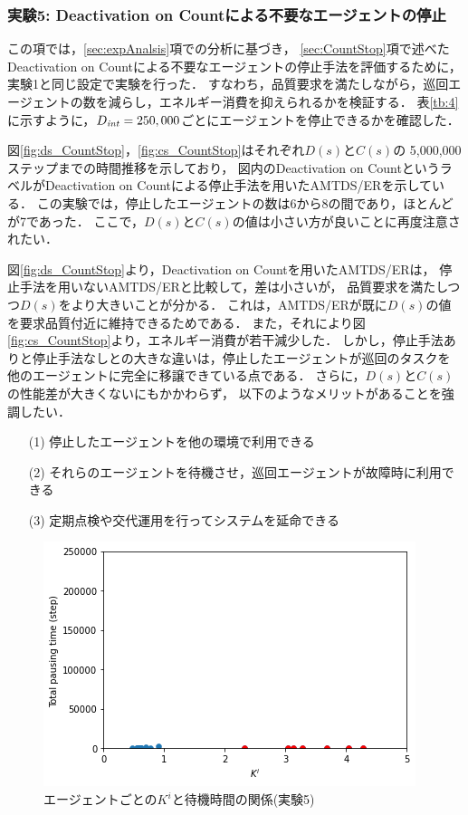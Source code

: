 \documentclass[12pt,a4j,twoside]{jarticle}
\def\DeactCheckInterval{D_{\it int}}
\begin{document}
  \subsubsection{実験5: Deactivation on Countによる不要なエージェントの停止}\label{ex:ER5}
  この項では，\ref{sec:expAnalsis}項での分析に基づき，
  \ref{sec:CountStop}項で述べたDeactivation on Countによる不要なエージェントの停止手法を評価するために，
  実験1と同じ設定で実験を行った．
  すなわち，品質要求を満たしながら，巡回エージェントの数を減らし，エネルギー消費を抑えられるかを検証する．
  表\ref{tb:4}に示すように，$\DeactCheckInterval=250,000$ごとにエージェントを停止できるかを確認した．
  \par

  図\ref{fig:ds_CountStop}，\ref{fig:cs_CountStop}はそれぞれ$D(s)$と$C(s)$の
  5,000,000ステップまでの時間推移を示しており，
  図内のDeactivation on CountというラベルがDeactivation on Countによる停止手法を用いたAMTDS/ERを示している．
  この実験では，停止したエージェントの数は6から8の間であり，ほとんどが7であった．
  ここで，$D(s)$と$C(s)$の値は小さい方が良いことに再度注意されたい．
  \par

  図\ref{fig:ds_CountStop}より，Deactivation on Countを用いたAMTDS/ERは，
  停止手法を用いないAMTDS/ERと比較して，差は小さいが，
  品質要求を満たしつつ$D(s)$をより大きいことが分かる．
  これは，AMTDS/ERが既に$D(s)$の値を要求品質付近に維持できるためである．
  また，それにより図\ref{fig:cs_CountStop}より，エネルギー消費が若干減少した．
  しかし，停止手法ありと停止手法なしとの大きな違いは，停止したエージェントが巡回のタスクを
  他のエージェントに完全に移譲できている点である．
  さらに，$D(s)$と$C(s)$の性能差が大きくないにもかかわらず，
  以下のようなメリットがあることを強調したい．
  \begin{enumerate}
    \item[(1)] 停止したエージェントを他の環境で利用できる
    \item[(2)] それらのエージェントを待機させ，巡回エージェントが故障時に利用できる
    \item[(3)] 定期点検や交代運用を行ってシステムを延命できる
  \end{enumerate}


  \begin{figure}
    \centering
    \includegraphics[width=0.8\hsize]{figures/CorrectionScatter_Office_CountStop.png}
    \caption{エージェントごとの$K^i$と待機時間の関係(実験5)}
    \label{fig:cscatter_CountStop_Office}
  \end{figure}
\end{document}
